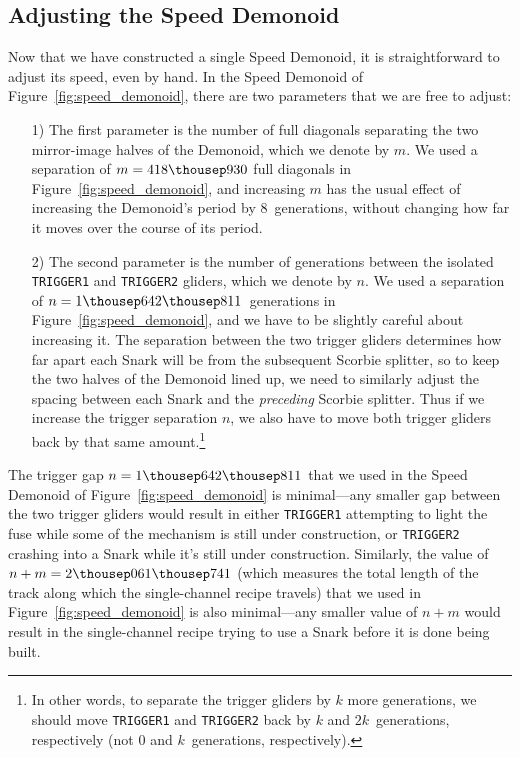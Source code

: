 \subsection{Adjusting the Speed Demonoid}\label{sec:speed_demonoid_adjust}

Now that we have constructed a single Speed Demonoid, it is straightforward to adjust its speed, even by hand. In the Speed Demonoid of Figure~\ref{fig:speed_demonoid}, there are two parameters that we are free to adjust:\smallskip

\begin{itemize}
	\item[1)] The first parameter is the number of full diagonals separating the two mirror-image halves of the Demonoid, which we denote by $m$. We used a separation of $m = 418{\thousep}930$ full diagonals in Figure~\ref{fig:speed_demonoid}, and increasing $m$ has the usual effect of increasing the Demonoid's period by $8$~generations, without changing how far it moves over the course of its period.\smallskip
	
	\item[2)] The second parameter is the number of generations between the isolated \texttt{TRIGGER1} and \texttt{TRIGGER2} gliders, which we denote by $n$. We used a separation of $n = 1{\thousep}642{\thousep}811$~generations in Figure~\ref{fig:speed_demonoid}, and we have to be slightly careful about increasing it. The separation between the two trigger gliders determines how far apart each Snark will be from the subsequent Scorbie splitter, so to keep the two halves of the Demonoid lined up, we need to similarly adjust the spacing between each Snark and the \emph{preceding} Scorbie splitter. Thus if we increase the trigger separation $n$, we also have to move both trigger gliders back by that same amount.\footnote{In other words, to separate the trigger gliders by $k$ more generations, we should move \texttt{TRIGGER1} and \texttt{TRIGGER2} back by $k$ and $2k$~generations, respectively (not $0$ and $k$~generations, respectively).}\smallskip
\end{itemize}

The trigger gap $n = 1{\thousep}642{\thousep}811$ that we used in the Speed Demonoid of Figure~\ref{fig:speed_demonoid} is minimal---any smaller gap between the two trigger gliders would result in either \texttt{TRIGGER1} attempting to light the fuse while some of the mechanism is still under construction, or \texttt{TRIGGER2} crashing into a Snark while it's still under construction. Similarly, the value of $n+m = 2{\thousep}061{\thousep}741$ (which measures the total length of the track along which the single-channel recipe travels) that we used in Figure~\ref{fig:speed_demonoid} is also minimal---any smaller value of $n+m$ would result in the single-channel recipe trying to use a Snark before it is done being built.

